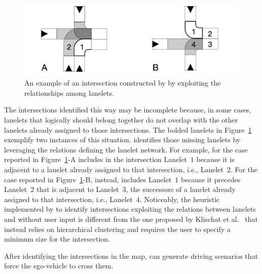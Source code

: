 \documentclass[conference]{IEEEtran}
\begin{document}
\begin{figure}
  \centering
    \includegraphics[width=0.95\columnwidth]{images/nonoverlapping}
  \caption{An example of an intersection constructed by \tool by exploiting the relationships among lanelets.}
  \label{fig:nonoverlapping}
\end{figure}

The intersections identified this way may be incomplete because, in some cases, lanelets that logically should belong together do not overlap with the other lanelets already assigned to those intersections. The bolded lanelets in Figure~\ref{fig:nonoverlapping} exemplify two instances of this situation. \tool identifies those missing lanelets by leveraging the relations defining the lanelet network. For example, for the case reported in \mbox{Figure~\ref{fig:nonoverlapping}-A} \tool includes in the intersection Lanelet~$1$ because it is adjacent to a lanelet already assigned to that intersection, i.e., Lanelet~$2$. For the case reported in \mbox{Figure~\ref{fig:nonoverlapping}-B}, instead, \tool includes Lanelet~$1$ because it precedes Lanelet~$2$ that is adjacent to Lanelet~$3$, the successors of a lanelet already assigned to that intersection, i.e., Lanelet~$4$. 
%
Noticeably, the heuristic implemented by \tool to identify intersections exploiting the relations between lanelets and without user input is different from the one proposed by Klischat et al.~\cite{DBLP:conf/itsc/KlischatLHA20} that instead relies on hierarchical clustering and requires the user to specify a minimum size for the intersection.

After identifying the intersections in the map, \tool can generate driving scenarios that force the ego-vehicle to cross them.
\end{document}
